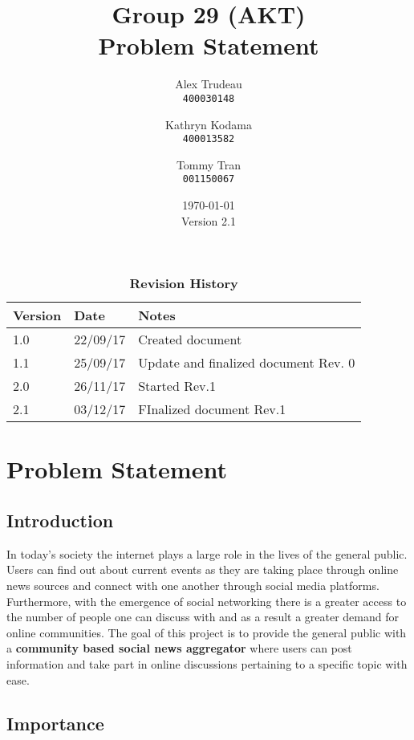 \documentclass[12pt,fleqn]{article}
\title{Group 29 (AKT)\\ Problem Statement}
\author{
Alex Trudeau\\
	\texttt{400030148}
\and
Kathryn Kodama\\
  	\texttt{400013582}
\and
Tommy Tran\\
	\texttt{001150067}
}
\date{\today\\Version 2.1}
\begin{document}
\maketitle
\begin{table}[ht]
\caption{\bf Revision History}
\begin{tabularx}{\textwidth}{p{3cm}p{2cm}X}
\toprule {\bf Version} & {\bf Date} & {\bf Notes}\\
\midrule
1.0 & 22/09/17 & Created document \\
1.1 & 25/09/17 & Update and finalized document Rev. 0 \\
\leavevmode\color{red}2.0 & \leavevmode\color{red}26/11/17 &\leavevmode \color{red}Started Rev.1 \\
\leavevmode\color{red}2.1 & \leavevmode\color{red}03/12/17 & \leavevmode\color{red}FInalized document Rev.1\\
\bottomrule
\end{tabularx}
\end{table}

\pagebreak
\section*{}
\section {Problem Statement}

\subsection{Introduction}

In today's society the internet plays a large role in the lives of the general public. Users can find out about current events as they are taking place through online news sources and connect with one another through social media platforms.  Furthermore, with the emergence of social networking there is a greater access to the number of people one can discuss with and as a result a greater demand for online communities.  The goal of this project is to provide the general public with a \textbf{community based social news aggregator} where users can post information and take part in online discussions pertaining to a specific topic with ease.  

\subsection{Importance}
\end{document}

